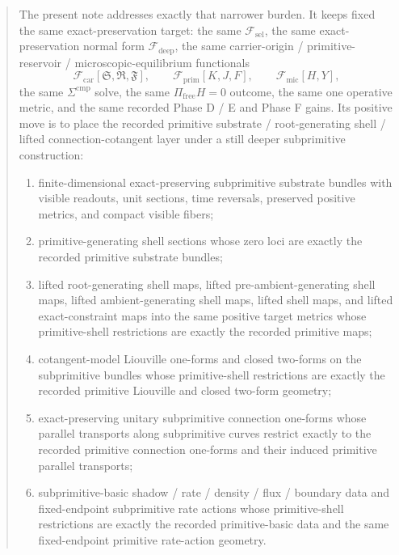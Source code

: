 \documentclass[11pt]{article}
\newcommand{\GaugeAux}{Y}
\newcommand{\MicFunctional}{\mathscr F_{\mathrm{mic}}}
\newcommand{\PrimFunctional}{\mathscr F_{\mathrm{prim}}}
\newcommand{\CarrierFunctional}{\mathscr F_{\mathrm{car}}}
\newcommand{\DeepFunctional}{\mathscr F_{\mathrm{deep}}}
\newcommand{\StemFunctional}{\mathscr F_{\mathrm{sel}}}
\newcommand{\PrimStrain}{K}
\newcommand{\PrimNeutral}{J}
\newcommand{\PrimFree}{F}
\newcommand{\CarrierSeed}{\mathfrak S}
\newcommand{\RelabelSeed}{\mathfrak R}
\newcommand{\FreeSeed}{\mathfrak F}
\begin{document}
\begin{abstract}
The present note addresses exactly that narrower burden. It keeps fixed the same exact-preservation target: the same \(\StemFunctional\), the same exact-preservation normal form \(\DeepFunctional\), the same carrier-origin / primitive-reservoir / microscopic-equilibrium functionals
\[
\CarrierFunctional[\CarrierSeed,\RelabelSeed,\FreeSeed],\qquad
\PrimFunctional[\PrimStrain,\PrimNeutral,\PrimFree],\qquad
\MicFunctional[H,\GaugeAux],
\]
the same \(\Sigma^{\mathrm{cmp}}\) solve, the same \(\Pi_{\mathrm{free}}H=0\) outcome, the same one operative metric, and the same recorded Phase D / E and Phase F gains. Its positive move is to place the recorded primitive substrate / root-generating shell / lifted connection-cotangent layer under a still deeper subprimitive construction:
\begin{enumerate}
    \item finite-dimensional exact-preserving subprimitive substrate bundles with visible readouts, unit sections, time reversals, preserved positive metrics, and compact visible fibers;
    \item primitive-generating shell sections whose zero loci are exactly the recorded primitive substrate bundles;
    \item lifted root-generating shell maps, lifted pre-ambient-generating shell maps, lifted ambient-generating shell maps, lifted shell maps, and lifted exact-constraint maps into the same positive target metrics whose primitive-shell restrictions are exactly the recorded primitive maps;
    \item cotangent-model Liouville one-forms and closed two-forms on the subprimitive bundles whose primitive-shell restrictions are exactly the recorded primitive Liouville and closed two-form geometry;
    \item exact-preserving unitary subprimitive connection one-forms whose parallel transports along subprimitive curves restrict exactly to the recorded primitive connection one-forms and their induced primitive parallel transports;
    \item subprimitive-basic shadow / rate / density / flux / boundary data and fixed-endpoint subprimitive rate actions whose primitive-shell restrictions are exactly the recorded primitive-basic data and the same fixed-endpoint primitive rate-action geometry.
\end{enumerate}


\end{abstract}
\end{document}
